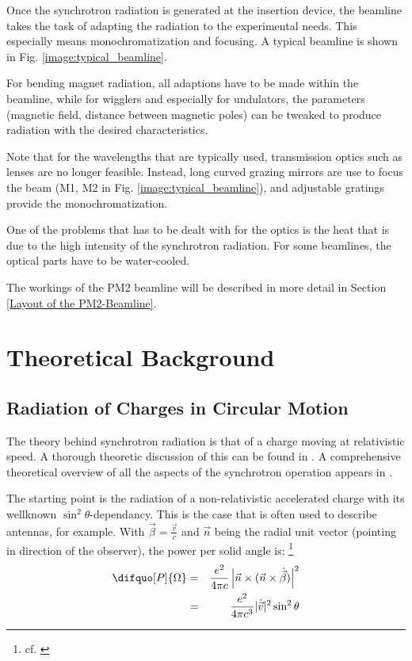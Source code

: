 \documentclass[a4paper,10pt]{article}
\begin{document}
    Once the synchrotron radiation is generated at the insertion device, the
beamline takes the task of adapting the radiation to the experimental needs.
This especially means monochromatization and focusing. A typical beamline is
shown in Fig. \ref{image:typical_beamline}.

    For bending magnet radiation, all adaptions have to be made within the
beamline, while for wigglers and especially for undulators, the parameters
(magnetic field, distance between magnetic poles) can be tweaked to produce
radiation with the desired characteristics.

    Note that for the wavelengths that are typically used, transmission optics
such as lenses are no longer feasible. Instead, long curved grazing mirrors are
use to focus the beam (M1, M2 in Fig. \ref{image:typical_beamline}), and
adjustable gratings provide the monochromatization. 

    One of the problems that has to be dealt with for the optics is the heat
that is due to the high intensity of the synchrotron radiation. For some
beamlines, the optical parts have to be water-cooled.

    The workings of the PM2 beamline will be described in more detail in Section
\ref{Layout of the PM2-Beamline}.


\section{Theoretical Background} \label{Theoretical Background}

    \subsection{Radiation of Charges in Circular Motion}
    The theory behind synchrotron radiation is that of a charge moving at
relativistic speed. A thorough theoretic discussion of this can be found in
\citep[Chapter 14]{jackson1999}. A comprehensive theoretical overview
of all the aspects of the synchrotron operation appears in \citep{wille1991}.

    The starting point is the radiation of a non-relativistic accelerated
charge with its wellknown $\sin^2\theta$-dependancy. This is the case that is often
used to describe antennas, for example. With $\vec{\beta} = \frac{\vec{v}}{c}$
and $\vec{n}$ being the radial unit vector (pointing in direction of the observer), the power per solid angle
is: \footnote{cf. \citep[p. 665]{jackson1999}}
\begin{eqnarray}
  \difquo[P]{\Omega} 
  &=& \frac{e^2}{4 \pi c} 
     \left|\vec{n} \times (\vec{n} \times \dot{\vec{\beta}}) \right|^2 
     \label{eq:angular_power_nonrelativistic}\\
  &=& \frac{e^2 }{4 \pi c^3}|\dot{\vec{v}}|^2 \sin^2 \theta 
\end{eqnarray}
\end{document}
